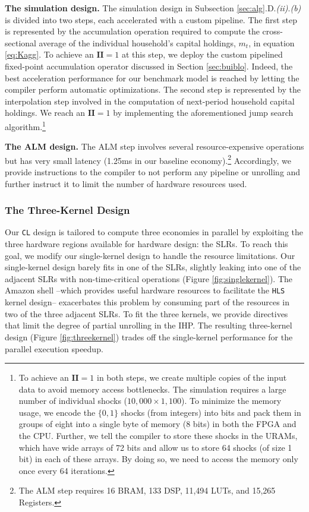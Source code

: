 \documentclass[12pt,american]{article}
\newcommand{\ALMtimebaseline}{1.25ms in our baseline economy}
\newcommand{\ALMresourcesexplog}{16 BRAM, 133 DSP, 11,494 LUTs, and 15,265 Registers}
\begin{document}
\textbf{The simulation design.} The simulation design in Subsection \ref{sec:alg}.D.\textit{(ii)}.\textit{(b)} is divided into two steps, each accelerated with a custom pipeline. The first step is represented by the accumulation operation required to compute the cross-sectional average of the individual household's capital holdings, $m_{t}$, in equation \eqref{eq:Kagg}. To achieve an $\textbf{II}=1$ at this step, we deploy the custom pipelined fixed-point accumulation operator discussed in Section \ref{sec:buiblo}. Indeed, the best acceleration performance for our benchmark model is reached by letting the compiler perform automatic optimizations. The second step is represented by the interpolation step involved in the computation of next-period household capital holdings. We reach an $\textbf{II}=1$ by implementing the aforementioned jump search algorithm.\footnote{To achieve an $\textbf{II}=1$ in both steps, we create multiple copies of the input data to avoid memory access bottlenecks. The simulation requires a large number of individual shocks ($10,000\times1,100$). To minimize the memory usage, we encode the $\{0,1\}$ shocks (from integers) into bits and pack them in groups of eight into a single byte of memory (8 bits) in both the FPGA and the CPU. Further, we tell the compiler to store these shocks in the URAMs, which have wide arrays of 72 bits and allow us to store 64 shocks (of size 1 bit) in each of these arrays. By doing so, we need to access the memory only once every 64 iterations.}

\textbf{The ALM design.} The ALM step involves several resource-expensive operations but has very small latency (\ALMtimebaseline).\footnote{The ALM step requires \ALMresourcesexplog.} Accordingly, we provide instructions to the compiler to not perform any pipeline or unrolling and further instruct it to limit the number of hardware resources used.

\subsubsection{The Three-Kernel Design}\label{sec:kerdesthree}

Our \texttt{CL} design is tailored to compute three economies in parallel by exploiting the three hardware regions available for hardware design: the SLRs. To reach this goal, we modify our single-kernel design to handle the resource limitations. Our single-kernel design barely fits in one of the SLRs, slightly leaking into one of the adjacent SLRs with non-time-critical operations (Figure \ref{fig:singlekernel}). The Amazon shell --which provides useful hardware resources to facilitate the \texttt{HLS} kernel design-- exacerbates this problem by consuming part of the resources in two of the three adjacent SLRs. To fit the three kernels, we provide directives that limit the degree of partial unrolling in the IHP. The resulting three-kernel design (Figure \ref{fig:threekernel}) trades off the single-kernel performance for the parallel execution speedup.
\end{document}
